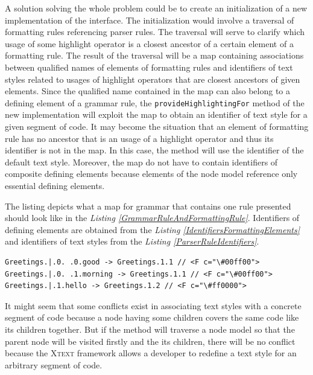 \documentclass[12pt,notitlepage,a4paper]{report}
\begin{document}
A solution solving the whole problem could be to create an initialization of a new implementation of the interface. The initialization would involve a traversal of formatting rules referencing parser rules. The traversal will serve to clarify which usage of some highlight operator is a closest ancestor of a certain element of a formatting rule. The result of the traversal will be a map containing associations between qualified names of elements of formatting rules and identifiers of text styles related to usages of highlight operators that are closest ancestors of given elements. Since the qualified name contained  in the map can also belong to a defining element of a grammar rule, the \texttt{provideHighlightingFor} method of the new implementation will exploit the map to obtain an identifier of text style for a given segment of code. It may become the situation that an element of formatting rule has no ancestor that is an usage of a highlight operator and thus its identifier is not in the map. In this case, the method will use the identifier of the default text style. Moreover, the map do not have to contain identifiers of composite defining elements because elements of the node model reference only essential defining elements.

\begin{expl}\label{Map}
The listing depicts what a map for grammar that contains one rule presented should look like in the \textit{Listing \ref{GrammarRuleAndFormattingRule}}. Identifiers of defining elements  are obtained from the \textit{Listing \ref{IdentifiersFormattingElements}} and identifiers of text styles from the \textit{Listing \ref{ParserRuleIdentifiers}}.
\begingroup
\fontsize{10pt}{12pt}
\begin{Verbatim}[commandchars=\\\{\}]
Greetings.|.0. .0.good -> Greetings.1.1 // <F c="\#00ff00">
Greetings.|.0. .1.morning -> Greetings.1.1 // <F c="\#00ff00">
Greetings.|.1.hello -> Greetings.1.2 // <F c="\#ff0000">
\end{Verbatim}
\endgroup
\end{expl}

It might seem that some conflicts exist in associating text styles with a concrete segment of code because a node having some children covers the same code like its children together. But if the method will traverse a node model so that the parent node will be visited firstly and the its children, there will be no conflict because the \textsc{Xtext} framework allows a developer to redefine a text style for an arbitrary segment of code.
\end{document}
